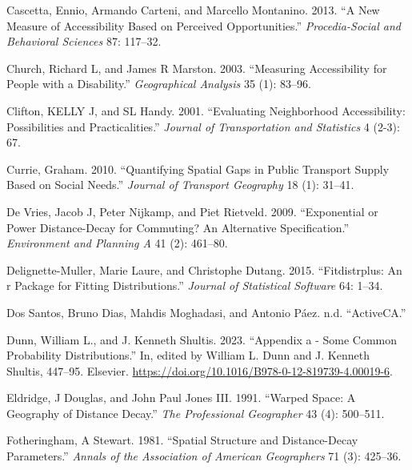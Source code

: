 \documentclass[preprint, 3p,
authoryear]{elsarticle} %
\newlength{\cslhangindent}
\newlength{\cslentryspacingunit} %
\newenvironment{CSLReferences}[2] %
 {%
  \setlength{\parindent}{0pt}
  \ifodd #1
  \let\oldpar\par
  \def\par{\hangindent=\cslhangindent\oldpar}
  \fi
  \setlength{\parskip}{#2\cslentryspacingunit}
 }%
 {}
\begin{document}
\begin{CSLReferences}{1}{0}
\leavevmode{}%
Cascetta, Ennio, Armando Carteni, and Marcello Montanino. 2013. {``A New
Measure of Accessibility Based on Perceived Opportunities.''}
\emph{Procedia-Social and Behavioral Sciences} 87: 117--32.

\leavevmode{}%
Church, Richard L, and James R Marston. 2003. {``Measuring Accessibility
for People with a Disability.''} \emph{Geographical Analysis} 35 (1):
83--96.

\leavevmode{}%
Clifton, KELLY J, and SL Handy. 2001. {``Evaluating Neighborhood
Accessibility: Possibilities and Practicalities.''} \emph{Journal of
Transportation and Statistics} 4 (2-3): 67.

\leavevmode{}%
Currie, Graham. 2010. {``Quantifying Spatial Gaps in Public Transport
Supply Based on Social Needs.''} \emph{Journal of Transport Geography}
18 (1): 31--41.

\leavevmode{}%
De Vries, Jacob J, Peter Nijkamp, and Piet Rietveld. 2009.
{``Exponential or Power Distance-Decay for Commuting? An Alternative
Specification.''} \emph{Environment and Planning A} 41 (2): 461--80.

\leavevmode{}%
Delignette-Muller, Marie Laure, and Christophe Dutang. 2015.
{``Fitdistrplus: An r Package for Fitting Distributions.''}
\emph{Journal of Statistical Software} 64: 1--34.

\leavevmode{}%
Dos Santos, Bruno Dias, Mahdis Moghadasi, and Antonio Páez. n.d.
{``ActiveCA.''}

\leavevmode{}%
Dunn, William L., and J. Kenneth Shultis. 2023. {``Appendix a - Some
Common Probability Distributions.''} In, edited by William L. Dunn and
J. Kenneth Shultis, 447--95. Elsevier.
\url{https://doi.org/10.1016/B978-0-12-819739-4.00019-6}.

\leavevmode{}%
Eldridge, J Douglas, and John Paul Jones III. 1991. {``Warped Space: A
Geography of Distance Decay.''} \emph{The Professional Geographer} 43
(4): 500--511.

\leavevmode{}%
Fotheringham, A Stewart. 1981. {``Spatial Structure and Distance-Decay
Parameters.''} \emph{Annals of the Association of American Geographers}
71 (3): 425--36.


\end{CSLReferences}
\end{document}
